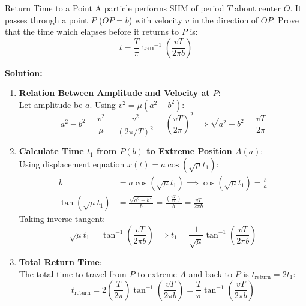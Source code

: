 \begin{examplebox}{Return Time to a Point}
A particle performs SHM of period $T$ about center $O$. It passes through a point $P$ ($OP = b$) with velocity $v$ in the direction of $OP$. Prove that the time which elapses before it returns to $P$ is:
\begin{equation*}
    t = \frac{T}{\pi} \tan^{-1}\left( \frac{v T}{2\pi b} \right)
\end{equation*}

\tcblower
\textbf{Solution:}

\begin{enumerate}[leftmargin=1.5em]
    \item \textbf{Relation Between Amplitude and Velocity at $P$}:\\
    Let amplitude be $a$. Using $v^2 = \mu(a^2 - b^2)$:
    \begin{equation*}
        a^2 - b^2 = \frac{v^2}{\mu} = \frac{v^2}{(2\pi/T)^2} = \left(\frac{v T}{2\pi}\right)^2 \implies \sqrt{a^2 - b^2} = \frac{v T}{2\pi}
    \end{equation*}

    \item \textbf{Calculate Time $t_1$ from $P(b)$ to Extreme Position $A(a)$}:\\
    Using displacement equation $x(t) = a \cos(\sqrt{\mu} t_1)$:
    \begin{align*}
        b &= a \cos(\sqrt{\mu} t_1) \implies \cos(\sqrt{\mu} t_1) = \frac{b}{a} \\
        \tan(\sqrt{\mu} t_1) &= \frac{\sqrt{a^2 - b^2}}{b} = \frac{\left(\frac{v T}{2\pi}\right)}{b} = \frac{v T}{2\pi b}
    \end{align*}
    Taking inverse tangent:
    \begin{equation*}
        \sqrt{\mu} t_1 = \tan^{-1}\left(\frac{v T}{2\pi b}\right) \implies t_1 = \frac{1}{\sqrt{\mu}} \tan^{-1}\left(\frac{v T}{2\pi b}\right)
    \end{equation*}

    \item \textbf{Total Return Time}:\\
    The total time to travel from $P$ to extreme $A$ and back to $P$ is $t_{\text{return}} = 2 t_1$:
    \begin{equation*}
        t_{\text{return}} = 2 \left( \frac{T}{2\pi} \right) \tan^{-1}\left(\frac{v T}{2\pi b}\right) = \frac{T}{\pi} \tan^{-1}\left(\frac{v T}{2\pi b}\right)
    \end{equation*}
\end{enumerate}
\end{examplebox}

